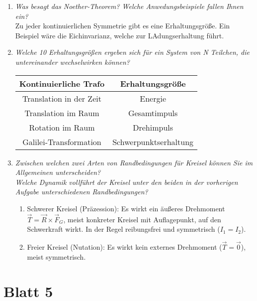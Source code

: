\begin{enumerate}
    \item \textit{Was besagt das Noether-Theorem? Welche Anwedungsbeispiele fallen Ihnen ein?} \\
        Zu jeder kontinuierlichen Symmetrie gibt es eine Erhaltungsgröße.
        Ein Beispiel wäre die Eichinvarianz, welche zur LAdungserhaltung führt.
    \item \textit{Welche \num{10} Erhaltungsgrößen ergeben sich für ein System von N Teilchen, die untereinander wechselwirken können?} \\
        \begin{table}
            \centering
            \begin{tabular}{c c}
                \toprule 
                {Kontinuierliche Trafo} & {Erhaltungsgröße} \\
                \midrule
                Translation in der Zeit& Energie\\
                Translation im Raum&Gesamtimpuls \\
                Rotation im Raum& Drehimpuls\\
                Galilei-Transformation& Schwerpunktserhaltung\\
            \end{tabular}
        \end{table}
    \item \textit{Zwischen welchen zwei Arten von Randbedingungen für Kreisel können Sie im Allgemeinen unterscheiden? \\ Welche Dynamik vollführt der Kreisel unter den beiden in der vorherigen Aufgabe unterschiedenen Randbedingungen?} \\
        \begin{enumerate}
            \item Schwerer Kreisel (Präzession): Es wirkt ein äußeres Drehmoment $\vec{T}=\vec{R} \times \vec{F}_G $, meist konkreter Kreisel mit Auflagepunkt, auf den Schwerkraft wirkt. In der Regel reibungsfrei und symmetrisch ($I_1=I_2$).
            \item Freier Kreisel (Nutation): Es wirkt kein externes Drehmoment ($\vec{T}=\vec{0}$), meist symmetrisch.  
        \end{enumerate}
\end{enumerate}

\newpage

\section*{Blatt 5}

